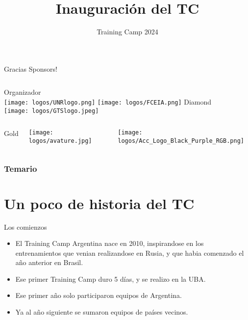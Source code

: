 \documentclass{beamer}
\title %
{Inauguración del TC}
\institute[]{Universidad Tecnológica Nacional - Facultad Regional Santa Fe}
\date[TC 2024]{Training Camp 2024}
\begin{document}
\frame{\titlepage}



\begin{frame}{Gracias Sponsors!}
    \begin{columns}[t]
        \centering
        Organizador\\
        \vspace{0.8cm}
        \texttt{[image: logos/UNRlogo.png]}
        \texttt{[image: logos/FCEIA.png]}
        \centering
        Diamond\\
        \texttt{[image: logos/GTSlogo.jpeg]}
    \end{columns}
    \begin{columns}[t]
        \centering
        Gold\\
        \begin{minipage}{0.5\textwidth}
            \centering
            \texttt{[image: logos/avature.jpg]}
        \end{minipage}%
        \begin{minipage}{0.5\textwidth}
            \centering
            \texttt{[image: logos/Acc\_Logo\_Black\_Purple\_RGB.png]}
        \end{minipage}
    \end{columns}
\end{frame}


\begin{frame}
\frametitle{Temario}
\tableofcontents
\end{frame}


\section{Un poco de historia del TC}

\begin{frame}{Los comienzos}
    
    \begin{itemize}
        \item El Training Camp Argentina nace en 2010, inspirandose en los entrenamientos que venian realizandose en Rusia, y que habia comenzado el año anterior en Brasil.
        \item Ese primer Training Camp duro 5 días, y se realizo en la UBA.
        \item Ese primer año solo participaron equipos de Argentina.
        \item Ya al año siguiente se sumaron equipos de países vecinos.
    \end{itemize}
\end{frame}
\end{document}
